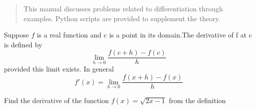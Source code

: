 \documentclass[journal,12pt,twocolumn]{IEEEtran}
\begin{document}
%
\IEEEpeerreviewmaketitle

\bigskip

\begin{abstract}
This manual discusses problems related to differentiation through examples.  Python scripts are provided to supplement the theory.
\end{abstract}
%
\begin{definition}
\label{def:derivative}
Suppose $f$ is  a real function and c is a point in its domain.The derivative of f at c is defined by 
\begin{equation}
\lim_{h \to 0} {\frac {f(c+h)-f(c)}{h}}
\end{equation}
provided this limit exists.
In general 
\begin{equation}
f'(x)=\lim_{h \to 0} {\frac {f(x+h)-f(x)}{h}}
\end{equation}
\end{definition}
\begin{problem}
Find the derivative of the function $f(x)=\sqrt{2x-1}$ from the definition
\end{problem}
%
\end{document}
